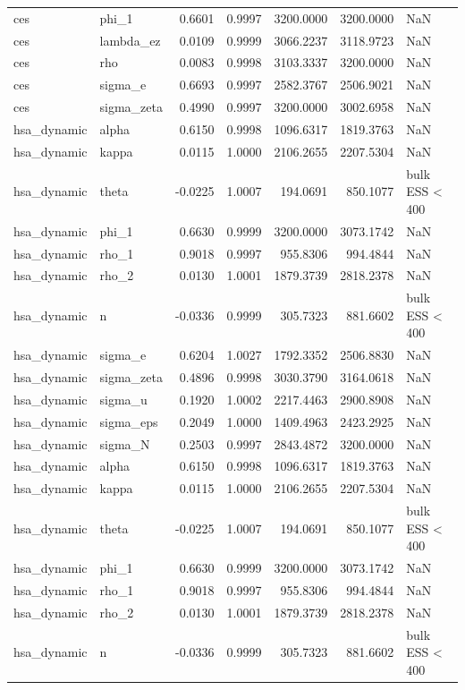 \begin{tabular}{llrrrrl}
ces & phi\_1 & 0.6601 & 0.9997 & 3200.0000 & 3200.0000 & NaN \\
ces & lambda\_ez & 0.0109 & 0.9999 & 3066.2237 & 3118.9723 & NaN \\
ces & rho & 0.0083 & 0.9998 & 3103.3337 & 3200.0000 & NaN \\
ces & sigma\_e & 0.6693 & 0.9997 & 2582.3767 & 2506.9021 & NaN \\
ces & sigma\_zeta & 0.4990 & 0.9997 & 3200.0000 & 3002.6958 & NaN \\
hsa\_dynamic & alpha & 0.6150 & 0.9998 & 1096.6317 & 1819.3763 & NaN \\
hsa\_dynamic & kappa & 0.0115 & 1.0000 & 2106.2655 & 2207.5304 & NaN \\
hsa\_dynamic & theta & -0.0225 & 1.0007 & 194.0691 & 850.1077 & bulk ESS < 400 \\
hsa\_dynamic & phi\_1 & 0.6630 & 0.9999 & 3200.0000 & 3073.1742 & NaN \\
hsa\_dynamic & rho\_1 & 0.9018 & 0.9997 & 955.8306 & 994.4844 & NaN \\
hsa\_dynamic & rho\_2 & 0.0130 & 1.0001 & 1879.3739 & 2818.2378 & NaN \\
hsa\_dynamic & n & -0.0336 & 0.9999 & 305.7323 & 881.6602 & bulk ESS < 400 \\
hsa\_dynamic & sigma\_e & 0.6204 & 1.0027 & 1792.3352 & 2506.8830 & NaN \\
hsa\_dynamic & sigma\_zeta & 0.4896 & 0.9998 & 3030.3790 & 3164.0618 & NaN \\
hsa\_dynamic & sigma\_u & 0.1920 & 1.0002 & 2217.4463 & 2900.8908 & NaN \\
hsa\_dynamic & sigma\_eps & 0.2049 & 1.0000 & 1409.4963 & 2423.2925 & NaN \\
hsa\_dynamic & sigma\_N & 0.2503 & 0.9997 & 2843.4872 & 3200.0000 & NaN \\
hsa\_dynamic & alpha & 0.6150 & 0.9998 & 1096.6317 & 1819.3763 & NaN \\
hsa\_dynamic & kappa & 0.0115 & 1.0000 & 2106.2655 & 2207.5304 & NaN \\
hsa\_dynamic & theta & -0.0225 & 1.0007 & 194.0691 & 850.1077 & bulk ESS < 400 \\
hsa\_dynamic & phi\_1 & 0.6630 & 0.9999 & 3200.0000 & 3073.1742 & NaN \\
hsa\_dynamic & rho\_1 & 0.9018 & 0.9997 & 955.8306 & 994.4844 & NaN \\
hsa\_dynamic & rho\_2 & 0.0130 & 1.0001 & 1879.3739 & 2818.2378 & NaN \\
hsa\_dynamic & n & -0.0336 & 0.9999 & 305.7323 & 881.6602 & bulk ESS < 400 \\

\end{tabular}
